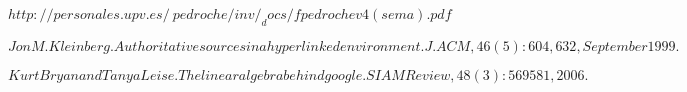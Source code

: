 \begin{thebibliography}{9}

  $http://personales.upv.es/~pedroche/inv/_docs/fpedrochev4(sema).pdf$

$Jon M. Kleinberg. Authoritative sources in a hyperlinked environment. J. ACM,
46(5):604,632, September 1999.$

$Kurt Bryan and Tanya Leise. The linear algebra behind google. SIAM Review, 48(3):569
581, 2006.$
\end{thebibliography}